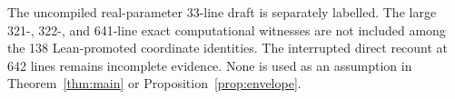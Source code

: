 The uncompiled real-parameter 33-line draft is separately labelled. The large 321-, 322-, and 641-line exact computational witnesses are not included among the 138 Lean-promoted coordinate identities. The interrupted direct recount at 642 lines remains incomplete evidence. None is used as an assumption in Theorem~\ref{thm:main} or Proposition~\ref{prop:envelope}.
